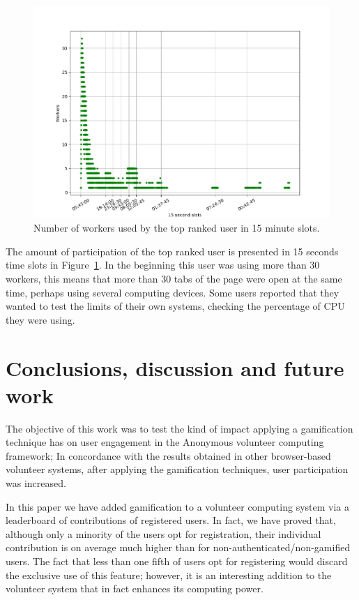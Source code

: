 \documentclass{llncs}
\begin{document}
\begin{figure}[htb]
    \centering
        \includegraphics[width=5in]{img/workers_best_user.png}
    \caption{ Number of workers used by the top ranked user in 15 minute slots.
    }
    \label{fig:top-user}
\end{figure}
%
The amount of participation of the top ranked user is presented in 15 seconds time slots in
Figure~\ref{fig:top-user}. In the beginning this user was using more than 30
workers, this means that more than 30 tabs of the page were open at the
same time, perhaps using several computing devices. Some users reported that
they wanted to test the limits of their own systems, checking the percentage of
CPU they were using.

\section{Conclusions, discussion and future work}

The objective of this work was to test the kind of impact
applying a gamification technique has on user engagement in
the Anonymous
volunteer computing framework; In concordance with
the results obtained in other
browser-based volunteer systems, after
applying the gamification techniques, user participation was increased.


In this paper we have added gamification to a volunteer computing
system via a leaderboard of contributions of registered users. In
fact, we have proved that, although only a minority of the users opt
for registration, their individual contribution is on average much
higher than for non-authenticated/non-gamified users. The fact that less
than one fifth of users opt for registering would discard the
exclusive use of this feature; however, it is an interesting addition
to the volunteer system that in fact enhances its computing power.
\end{document}
